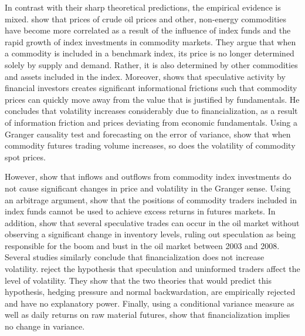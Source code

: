 \documentclass[12pt]{article}
\begin{document}
 In contrast with their sharp theoretical predictions, the empirical evidence is mixed. \citet{tang2012index} show that prices of crude oil prices and other, non-energy commodities have become more correlated as a result of the influence of index funds and the rapid growth of index investments in commodity markets. They argue that when a commodity is included in a benchmark index, its price is no longer determined solely by supply and demand. Rather, it is also determined by other commodities and assets included in the index. Moreover, \citet{singleton2014investor} shows that speculative activity by financial investors creates significant informational frictions such that commodity prices can quickly move away from the value that is justified by fundamentals. He concludes that volatility increases considerably due to financialization, as a result of information friction and prices deviating from economic fundamentals. Using a Granger causality test and forecasting on the error of variance, \citet{yang2005futures} show that when commodity futures trading volume increases, so does the volatility of commodity spot prices. 

However, \citet{stoll2010commodity}  show that inflows and outflows from commodity index investments do not cause significant changes in price and volatility in the Granger sense. Using an arbitrage argument, \citet{hamilton2014risk} show that the positions of commodity traders included in index funds cannot be used to achieve excess returns in  futures markets. In addition, \citet{kilian2014role}  show that several speculative trades can occur in the oil market without observing a significant change in inventory levels, ruling out speculation as being responsible for the boom and bust in the oil market between 2003 and 2008. Several studies similarly conclude that financialization does not increase volatility. \citet{bryant2006causality} reject the hypothesis that speculation and uninformed traders affect the level of volatility. They show that the two theories that would predict this hypothesis, hedging pressure and normal backwardation, are empirically rejected and have no explanatory power. Finally, using a conditional variance measure as well as daily returns on raw material futures, \citet{bohl2013does} show that financialization implies no change in variance.
\end{document}
